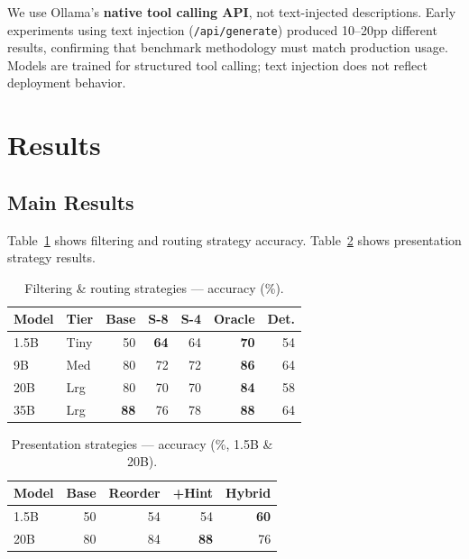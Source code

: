 \documentclass[11pt]{article}
\begin{document}
We use Ollama's \textbf{native tool calling API}, not text-injected descriptions. Early experiments using text injection (\texttt{/api/generate}) produced 10--20pp different results, confirming that benchmark methodology must match production usage. Models are trained for structured tool calling; text injection does not reflect deployment behavior.

\section{Results}

\subsection{Main Results}

Table~\ref{tab:accuracy_filter} shows filtering and routing strategy accuracy. Table~\ref{tab:accuracy_present} shows presentation strategy results.

\begin{table}[h]
\centering
\caption{Filtering \& routing strategies --- accuracy (\%).}
\label{tab:accuracy_filter}
\small
\begin{tabular}{@{}llrrrrr@{}}
\toprule
Model & Tier & Base & S-8 & S-4 & Oracle & Det. \\
\midrule
1.5B & Tiny & 50 & \textbf{64} & 64 & \textbf{70} & 54 \\
9B & Med & 80 & 72 & 72 & \textbf{86} & 64 \\
20B & Lrg & 80 & 70 & 70 & \textbf{84} & 58 \\
35B & Lrg & \textbf{88} & 76 & 78 & \textbf{88} & 64 \\
\bottomrule
\end{tabular}
\end{table}

\begin{table}[h]
\centering
\caption{Presentation strategies --- accuracy (\%, 1.5B \& 20B).}
\label{tab:accuracy_present}
\small
\begin{tabular}{@{}lrrrr@{}}
\toprule
Model & Base & Reorder & +Hint & Hybrid \\
\midrule
1.5B & 50 & 54 & 54 & \textbf{60} \\
20B & 80 & 84 & \textbf{88} & 76 \\
\bottomrule
\end{tabular}
\end{table}
\end{document}
